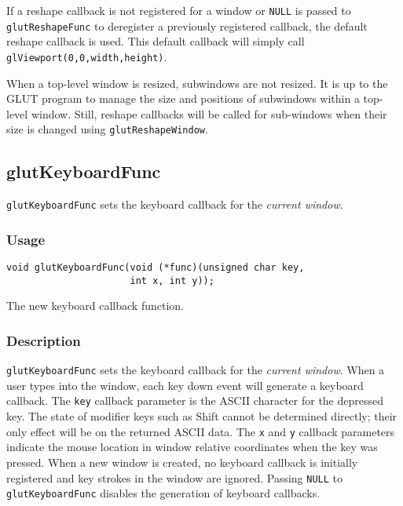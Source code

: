 If a reshape callback is not registered for a window or {\tt NULL} is
passed to {\tt glutReshapeFunc} to deregister a previously registered
callback, the default reshape callback is used.  This default callback
will simply call {\tt glViewport(0,0,width,height)}.

When a top-level window is resized, subwindows are not resized.  It is
up to the GLUT program to manage the size and positions of subwindows
within a top-level window.  Still, reshape callbacks will be called for
sub-windows when their size is changed using {\tt glutReshapeWindow}.

\subsection{glutKeyboardFunc}

{\tt glutKeyboardFunc} sets the keyboard callback for the {\em current window}.

\subsubsection*{Usage}

\begin{verbatim}
void glutKeyboardFunc(void (*func)(unsigned char key,
                      int x, int y));
\end{verbatim}
\begin{description}
\itemsep 0in
\item[\tt func]
The new keyboard callback function.
\end{description}

\subsubsection*{Description}

{\tt glutKeyboardFunc} sets the keyboard callback for the {\em current window}.
When a user types into the window, each key down event will generate a
keyboard callback.  The {\tt key} callback parameter is the ASCII character
for the depressed key.  The state of modifier keys such as Shift cannot be
determined directly; their only effect will be on the returned ASCII data.
The {\tt x} and {\tt y} callback
parameters indicate the mouse location in window relative coordinates
when the key was pressed.  When a new window is created, no keyboard
callback is initially registered and key strokes in the window are
ignored.  
Passing {\tt NULL} to {\tt glutKeyboardFunc} disables
the generation of keyboard callbacks.

